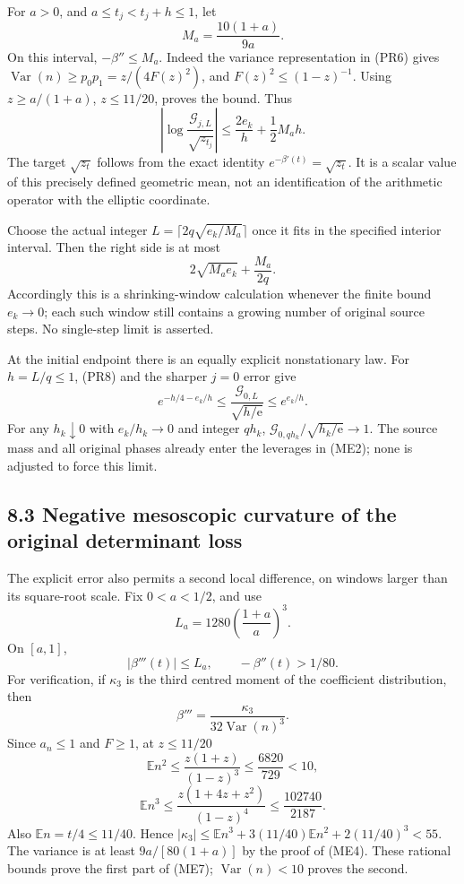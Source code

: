 \documentclass[10pt]{article}
\begin{document}
For \(a>0\), and \(a\le t_j<t_j+h\le1\), let \[
 M_a=\frac{10(1+a)}{9a}.
\] On this interval, \(-\beta''\le M_a\). Indeed the variance representation in (PR6) gives \(\operatorname{Var}(n)\ge p_0p_1=z/(4F(z)^2)\), and \(F(z)^2\le(1-z)^{-1}\). Using \(z\ge a/(1+a)\), \(z\le11/20\), proves the bound. Thus \[
 \boxed{\left|\log\frac{\mathcal G_{j,L}}{\sqrt{z_{t_j}}}\right|
 \le\frac{2e_k}{h}+\frac12M_a h.}
 \tag{ME4}
\] The target \(\sqrt{z_t}\) follows from the exact identity \(e^{-\beta'(t)}=\sqrt{z_t}\). It is a scalar value of this precisely defined geometric mean, not an identification of the arithmetic operator with the elliptic coordinate.

Choose the actual integer \(L=\lceil2q\sqrt{e_k/M_a}\rceil\) once it fits in the specified interior interval. Then the right side is at most \[
 2\sqrt{M_a e_k}+\frac{M_a}{2q}.
 \tag{ME5}
\] Accordingly this is a shrinking-window calculation whenever the finite bound \(e_k\to0\); each such window still contains a growing number of original source steps. No single-step limit is asserted.

At the initial endpoint there is an equally explicit nonstationary law. For \(h=L/q\le1\), (PR8) and the sharper \(j=0\) error give \[
 \boxed{
 e^{-h/4-e_k/h}
 \le\frac{\mathcal G_{0,L}}{\sqrt{h/\mathrm e}}
 \le e^{e_k/h}.}
 \tag{ME6}
\] For any \(h_k\downarrow0\) with \(e_k/h_k\to0\) and integer \(qh_k\), \(\mathcal G_{0,qh_k}/\sqrt{h_k/\mathrm e}\to1\). The source mass and all original phases already enter the leverages in (ME2); none is adjusted to force this limit.

\subsection{8.3 Negative mesoscopic curvature of the original determinant loss}\label{negative-mesoscopic-curvature-of-the-original-determinant-loss}

The explicit error also permits a second local difference, on windows larger than its square-root scale. Fix \(0<a<1/2\), and use \[
 L_a=1280\left(\frac{1+a}{a}\right)^3.
\] On \([a,1]\), \[
 \boxed{|\beta'''(t)|\le L_a,\qquad -\beta''(t)>1/80.}
 \tag{ME7}
\] For verification, if \(\kappa_3\) is the third centred moment of the coefficient distribution, then \[
 \beta'''=\frac{\kappa_3}{32\operatorname{Var}(n)^3}.
\] Since \(a_n\le1\) and \(F\ge1\), at \(z\le11/20\) \[
 \mathbb E n^2\le\frac{z(1+z)}{(1-z)^3}\le\frac{6820}{729}<10,
\] \[
 \mathbb E n^3\le\frac{z(1+4z+z^2)}{(1-z)^4}\le\frac{102740}{2187}.
\] Also \(\mathbb E n=t/4\le11/40\). Hence \(|\kappa_3|\le\mathbb E n^3+3(11/40)\mathbb E n^2+2(11/40)^3<55\). The variance is at least \(9a/[80(1+a)]\) by the proof of (ME4). These rational bounds prove the first part of (ME7); \(\operatorname{Var}(n)<10\) proves the second.
\end{document}
